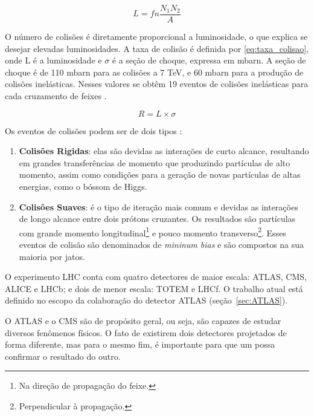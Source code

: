 
\begin{equation} \label{eq:luminosidade}
L=fn\frac{N_1 N_2}{A}
\end{equation}

O número de colisões é diretamente proporcional a luminosidade, o que explica
se desejar elevadas luminosidades. A taxa de colisão é definida por
\ref{eq:taxa_colisao}, onde L é a luminosidade e $\sigma$ é a seção de choque,
expressa em mbarn. A seção de choque é de 110 mbarn para as colisões a 7 TeV, e
60 mbarn para a produção de colisões inelásticas.
Nesses valores se obtêm 19 eventos de colisões inelásticas para cada
cruzamento de feixes \cite{webLHC,ATLAS_TDR}.

\begin{equation}
R = L \times \sigma
\label{eq:taxa_colisao}
\end{equation}


Os eventos de colisões podem ser de dois tipos \cite{THESIS_LAR}:

\begin{enumerate}
\item \textbf{Colisões Rigidas}:
elas são devidas as interações de curto alcance,
resultando em grandes transferências de momento que produzindo partículas de
alto momento, assim como condições para a geração de novas partículas de altas
energias, como o bóssom de Higgs.
\item \textbf{Colisões Suaves}: 
é o tipo de iteração mais comum e devidas as interações de longo alcance entre dois prótons cruzantes. Os
resultados são partículas com grande momento longitudinal\footnote{Na direção de
propagação do feixe.} e pouco momento transverso\footnote{Perpendicular à
propagação.}. Esses eventos de colisão são
denominados de \emph{mininum bias} e são compostos na sua maioria por jatos.
\end{enumerate}

O experimento LHC conta com quatro detectores de maior escala: ATLAS, CMS, ALICE e
LHCb; e dois de menor escala: TOTEM e LHCf. O trabalho atual está definido no
escopo da colaboração do detector ATLAS (seção~\ref{sec:ATLAS}).

O ATLAS e o CMS são de propósito geral, ou seja, são capazes de estudar diversos
fenômenos físicos. O fato de existirem dois detectores projetados de forma
diferente, mas para o mesmo fim, é importante para que um possa confirmar o
resultado do outro.

